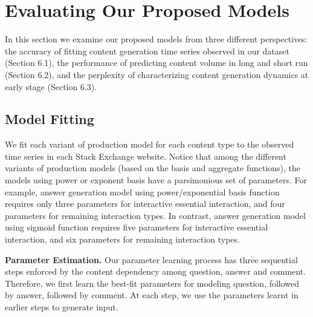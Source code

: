 \section{Evaluating Our Proposed Models}
In this section we examine our proposed models from three different perspectives: the accuracy of fitting content generation time series observed in our dataset (Section 6.1), the performance of predicting content volume in long and short run (Section 6.2), and the perplexity of characterizing content generation dynamics at early stage (Section 6.3).

\subsection{Model Fitting}
We fit each variant of production model for each content type to the observed time series in each Stack Exchange website. Notice that among the different variants of production models (based on the basis and aggregate functions), the models using power or exponent basis have a parsimonious set of parameters. For example, answer generation model using power/exponential basis function requires only three parameters for interactive essential interaction, and four parameters for remaining interaction types. In contrast, answer generation model using sigmoid function requires five parameters for interactive essential interaction, and six parameters for remaining interaction types. 

\textbf{Parameter Estimation.} Our parameter learning process has three sequential steps enforced by the content dependency among question, answer and comment. Therefore, we first learn the best-fit parameters for modeling question, followed by answer, followed by comment. At each step, we use the parameters learnt in earlier steps to generate input. 

